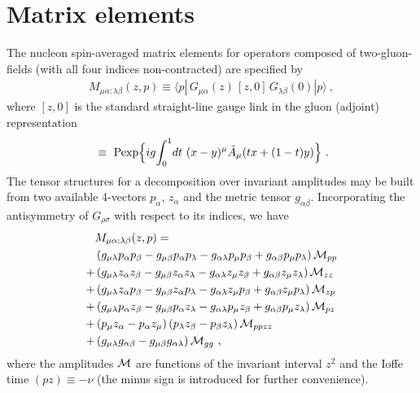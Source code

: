 \section{Matrix elements}

The nucleon spin-averaged matrix elements for operators composed of two-gluon-fields (with all
four indices non-contracted) are specified by
\begin{align}
{ M}_{\mu \alpha; \lambda \beta } (z,p) \equiv \langle p | \,
G_{\mu \alpha} (z) \, [z,0]\, G_{\lambda \beta} (0) | p \rangle \ ,
\end{align}
where $[z,0]$ is the standard straight-line gauge link
in the gluon (adjoint)
representation
\begin{align}
[x,y]~\equiv~{\rm Pexp}\Big\{ig\!\int_0^1\! dt~(x-y)^\mu \tilde{A}_\mu(tx+(1-t)y)\Big\}
\ .
\label{straightE}
\end{align}
The tensor structures for a decomposition over invariant amplitudes
may be built from two available 4-vectors $p_\alpha$, $z_\alpha$ and the
metric tensor $g_{\alpha \beta}$. Incorporating the antisymmetry of $G_{\rho \sigma}$ with respect to its indices, we have
\begin{align}
& { M}_{\mu \alpha; \lambda \beta} (z,p)= \nonumber \\ &
\left( g_{\mu\lambda} p_\alpha p_\beta - g_{\mu\beta} p_\alpha p_\lambda - g_{\alpha\lambda} p_\mu p_\beta + g_{\alpha\beta} p_\mu p_\lambda \right) \mathcal{M}_{pp} \nonumber \\
+& \left( g_{\mu\lambda} z_\alpha z_\beta - g_{\mu\beta} z_\alpha z_\lambda - g_{\alpha\lambda} z_\mu z_\beta + g_{\alpha\beta} z_\mu z_\lambda \right) \mathcal{M}_{zz} \nonumber \\
+ & \left( g_{\mu\lambda} z_\alpha p_\beta - g_{\mu\beta} z_\alpha p_\lambda - g_{\alpha\lambda} z_\mu p_\beta + g_{\alpha\beta} z_\mu p_\lambda \right) \mathcal{M}_{zp} \nonumber \\
+ & \left( g_{\mu\lambda} p_\alpha z_\beta - g_{\mu\beta} p_\alpha z_\lambda - g_{\alpha\lambda} p_\mu z_\beta + g_{\alpha\beta} p_\mu z_\lambda \right) \mathcal{M}_{pz} \nonumber \\
+& \left( p_\mu z_\alpha - p_\alpha z_\mu\right) \left( p_\lambda z_\beta - p_\beta z_\lambda\right) \mathcal{M}_{ppzz}
\nonumber \\  + & \left(g_{\mu\lambda} g_{\alpha\beta} -g_{\mu\beta} g_{\alpha\lambda} \right)\mathcal{M}_{gg} \ ,
\label{Manb}
\end{align}
where the amplitudes ${\cal M}$ are functions of
the invariant interval $z^2$ and the Ioffe time \cite{Ioffe:1969kf}
$(pz)\equiv - \nu$ (the minus sign
is introduced for further convenience).


